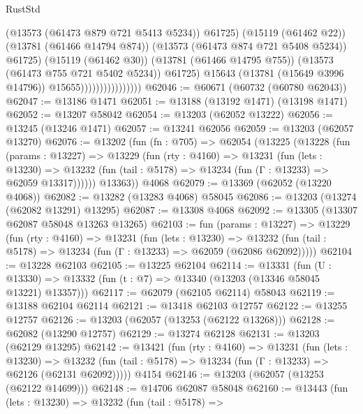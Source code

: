 \begin{lexlean}{RustStd}
\begin{coremodule}
                                          (@13573 (@61473 @879 @721 @5413 @5234))
                                          @61725)
                                        (@15119 (@61462 @22))
                                        (@13781 (@61466 @14794 @874))
                                        (@13573 (@61473 @874 @721 @5408 @5234))
                                        @61725)
                                      (@15119 (@61462 @30))
                                      (@13781 (@61466 @14795 @755))
                                      (@13573 (@61473 @755 @721 @5402 @5234))
                                      @61725)
                                    @15643
                                    (@13781 (@15649 @3996 @14796))
                                    @15655))))))))))))))))
@62046 := @60671 (@60732 (@60780 @62043))
@62047 := @13186 @1471
@62051 := @13188 (@13192 @1471) (@13198 @1471)
@62052 := @13207 @58042
@62054 := @13203 (@62052 @13222)
@62056 := @13245 (@13246 @1471)
@62057 := @13241 @62056
@62059 := @13203 (@62057 @13270)
@62076 := @13202
    (fun (fn : @705) =>
    @62054
      (@13225
        (@13228
          (fun (params : @13227) =>
          @13229
            (fun (rty : @4160) =>
            @13231
              (fun (lets : @13230) =>
              @13232 (fun (tail : @5178) => @13234 (fun (Γ : @13233) => @62059 @13317))))))
        @13363))
    @4068
@62079 := @13369 (@62052 (@13220 @4068))
@62082 := @13282 (@13283 @4068) @58045
@62086 := @13203 (@13274 (@62082 @13291) @13295)
@62087 := @13308 @4068
@62092 := @13305 (@13307 @62087 @58048 @13263 @13265)
@62103 := fun (params : @13227) =>
  @13229
    (fun (rty : @4160) =>
    @13231
      (fun (lets : @13230) =>
      @13232 (fun (tail : @5178) => @13234 (fun (Γ : @13233) => @62059 (@62086 @62092)))))
@62104 := @13228 @62103
@62105 := @13225 @62104
@62114 := @13331
    (fun (U : @13330) => @13332 (fun (t : @7) => @13340 (@13203 (@13346 @58045 @13221) @13357)))
@62117 := @62079 (@62105 @62114) @58043
@62119 := @13188 @62104 @62114
@62121 := @13418 @62103 @12757
@62122 := @13255 @12757
@62126 := @13203 (@62057 (@13253 (@62122 @13268)))
@62128 := @62082 (@13290 @12757)
@62129 := @13274 @62128
@62131 := @13203 (@62129 @13295)
@62142 := @13421
    (fun (rty : @4160) =>
    @13231
      (fun (lets : @13230) =>
      @13232 (fun (tail : @5178) => @13234 (fun (Γ : @13233) => @62126 (@62131 @62092)))))
    @4154
@62146 := @13203 (@62057 (@13253 (@62122 @14699)))
@62148 := @14706 @62087 @58048
@62160 := @13443
    (fun (lets : @13230) =>
    @13232
      (fun (tail : @5178) =>

\end{coremodule}
\end{lexlean}
